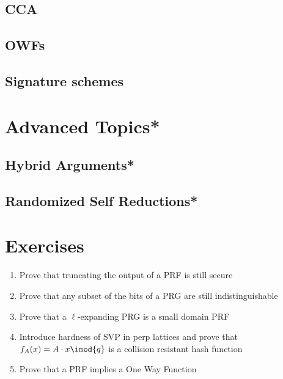 \documentclass[A4, 11pt]{article}
\begin{document}
\subsection{CCA}

\subsection{OWFs}

\subsection{Signature schemes}

\section{Advanced Topics*}

\subsection{Hybrid Arguments*}

\subsection{Randomized Self Reductions*}

\section{Exercises}

\begin{enumerate}
\item Prove that truncating the output of a PRF is still secure
\item Prove that any subset of the bits of a PRG are still indistinguishable
\item Prove that a $\ell$-expanding PRG is a small domain PRF
\item Introduce hardness of SVP in perp lattices and prove that
$f_A(x)=A\cdot x \imod{q}$ is a collision resistant hash function
\item Prove that a PRF implies a One Way Function
\end{enumerate}
\end{document}
